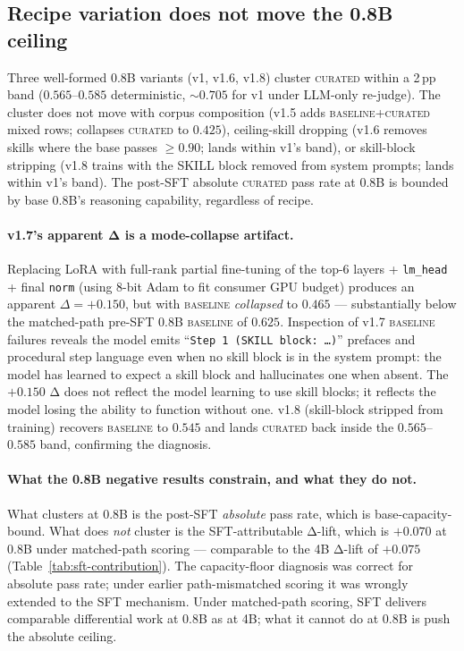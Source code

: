 \documentclass[10pt]{article}
\newcommand{\BL}{\textsc{baseline}\xspace}
\newcommand{\CU}{\textsc{curated}\xspace}
\begin{document}
\subsection{Recipe variation does not move the 0.8B ceiling}\label{sec:0.8b-recipe-variants}
Three well-formed 0.8B variants (v1, v1.6, v1.8) cluster \CU{} within a 2\,pp band ($0.565$--$0.585$ deterministic, $\sim 0.705$ for v1 under LLM-only re-judge). The cluster does not move with corpus composition (v1.5 adds \BL+\CU mixed rows; collapses \CU{} to $0.425$), ceiling-skill dropping (v1.6 removes skills where the base passes $\geq 0.90$; lands within v1's band), or skill-block stripping (v1.8 trains with the SKILL block removed from system prompts; lands within v1's band). The post-SFT absolute \CU{} pass rate at 0.8B is bounded by base 0.8B's reasoning capability, regardless of recipe.

\paragraph{v1.7's apparent Δ is a mode-collapse artifact.} Replacing LoRA with full-rank partial fine-tuning of the top-6 layers + \texttt{lm\_head} + final \texttt{norm} (using 8-bit Adam to fit consumer GPU budget) produces an apparent $\Delta = +0.150$, but with \BL{} \emph{collapsed} to $0.465$ --- substantially below the matched-path pre-SFT 0.8B \BL{} of $0.625$. Inspection of v1.7 \BL{} failures reveals the model emits ``\texttt{Step 1 (SKILL block: \dots)}'' prefaces and procedural step language even when no skill block is in the system prompt: the model has learned to expect a skill block and hallucinates one when absent. The $+0.150$ Δ does not reflect the model learning to use skill blocks; it reflects the model losing the ability to function without one. v1.8 (skill-block stripped from training) recovers \BL{} to $0.545$ and lands \CU{} back inside the $0.565$--$0.585$ band, confirming the diagnosis.

\paragraph{What the 0.8B negative results constrain, and what they do not.} What clusters at 0.8B is the post-SFT \emph{absolute} pass rate, which is base-capacity-bound. What does \emph{not} cluster is the SFT-attributable Δ-lift, which is $+0.070$ at 0.8B under matched-path scoring --- comparable to the 4B Δ-lift of $+0.075$ (Table~\ref{tab:sft-contribution}). The capacity-floor diagnosis was correct for absolute pass rate; under earlier path-mismatched scoring it was wrongly extended to the SFT mechanism. Under matched-path scoring, SFT delivers comparable differential work at 0.8B as at 4B; what it cannot do at 0.8B is push the absolute ceiling.
\end{document}
